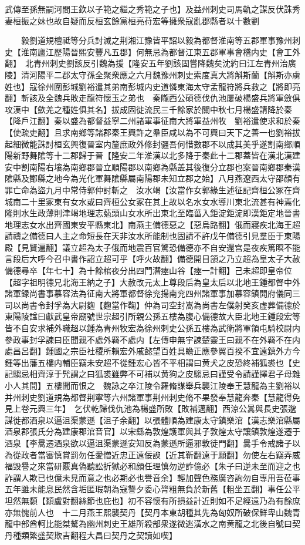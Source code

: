 武傳至孫無嗣河間王欽以子範之繼之秀範之子也】及益州刺史司馬軌之謀反伏誅秀妻桓振之妹也故自疑而反桓玄餘黨桓亮苻宏等擁衆寇亂郡縣者以十數劉

　　毅劉道規檀祗等分兵討滅之荆湘江豫皆平詔以毅為都督淮南等五郡軍事豫州刺史【淮南廬江歷陽晉熙安豐凡五郡】何無忌為都督江東五郡軍事會稽内史【會工外翻】　北青州刺史劉該反引魏為援【隆安五年劉該固嘗降魏矣沈約曰江左青州治廣陵】清河陽平二郡太守孫全聚衆應之六月魏豫州刺史索度真大將斛斯蘭【斛斯亦虜姓也】寇徐州圍彭城劉裕遣其弟南彭城内史道憐東海太守孟龍符將兵救之【將即亮翻】斬該及全魏兵敗走龍符懷玉之弟也　秦隴西公碩德伐仇池屢破楊盛兵將軍斂俱攻漢中【歛羌之種姓俱其名】拔成固徙流民三千餘家於關中秋七月楊盛請降於秦【降戶江翻】秦以盛為都督益寧二州諸軍事征南大將軍益州牧　劉裕遣使求和於秦【使疏吏翻】且求南鄉等諸郡秦王興許之羣臣咸以為不可興曰天下之善一也劉裕拔起細微能誅討桓玄興復晉室内釐庶政外修封疆吾何惜數郡不以成其美乎遂割南鄉順陽新野舞隂等十二郡歸于晉【隆安二年淮漢以北多降于秦此十二郡蓋皆在漢北漢建安中割南陽右壤為南鄉郡晉立順陽郡以南鄉為縣盖其後復分立郡也案晉南鄉郡秦漢隂縣及鄼縣之地今為光化軍舞隂縣屬南陽郡未知立郡之始】八月燕遼西太守邵顔有罪亡命為盜九月中常侍郭仲討斬之　汝水竭【汝當作女郭緣生述征記齊桓公冢在齊城南二十里冢東有女水或曰齊桓公女冢在其上故以名水女水導川東北流甚有神焉化隆則水生政薄則津竭地理志葂頭山女水所出東北至臨菑入鉅淀鉅淀即漢鉅定地晉書地理志女水出齊國東安平縣東北】南燕主備德惡之【惡烏路翻】俄而寢疾北海王超請禱之備德曰人主之命短長在天非汝水所能制也固請不許戊午備德引見羣臣于東陽殿【見賢遍翻】議立超為太子俄而地震百官驚恐備德亦不自安還宫是夜疾篤瞑不能言段后大呼今召中書作詔立超可乎【呼火故翻】備德開目頷之乃立超為皇太子大赦備德尋卒【年七十】為十餘棺夜分出四門潛瘞山谷【瘞一計翻】己未超即皇帝位【超字祖明德兄北海王納之子】大赦改元太上尊段后為皇太后以北地王鍾都督中外諸軍録尚書事慕容法為征南大將軍都督徐兖揚南兖四州諸軍事加慕容鎮開府儀同三司以尚書令封孚為大尉麴【麴當作鞠】仲為司空封嵩為尚書左僕射癸亥虚葬備德於東陽陵諡曰獻武皇帝廟號世宗超引所親公孫五樓為腹心備德故大臣北地王鍾段宏等皆不自安求補外職超以鍾為青州牧宏為徐州刺史公孫五樓為武衛將軍領屯騎校尉内參政事封孚諫曰臣聞親不處外羇不處内【左傳申無宇諫楚靈王曰親不在外羇不在内處昌呂翻】鍾國之宗臣社稷所賴宏外戚懿望百姓具瞻正應參翼百揆不宜遠鎮外方今鍾等出藩五樓内輔臣竊未安超不從鍾宏心皆不平相謂曰黄犬之皮恐終補狐裘也【史記騶忌相齊淳于髠謂之曰狐裘雖弊不可補以黄狗之皮騶忌曰謹受令請謹擇君子母雜小人其間】五樓聞而恨之　魏詠之卒江陵令羅脩謀舉兵襲江陵奉王慧龍為主劉裕以并州刺史劉道規為都督荆寧等六州諸軍事荆州刺史脩不果發奉慧龍奔秦【慧龍得免見上卷元興三年】　乞伏乾歸伐仇池為楊盛所敗【敗補邁翻】西涼公暠與長史張邈謀徙都酒泉以逼沮渠蒙遜【沮子余翻】以張體順為建康太守鎮樂涫【漢志樂涫縣屬酒泉郡張氏分為建康郡涫音官】以宋繇為敦煌護軍與其子敦煌太守讓鎮敦煌遂遷于酒泉【李暠遷酒泉欲以逼沮渠蒙遜安知反為蒙遜所逼邪敦徒門翻】暠手令戒諸子以為從政者當審慎賞罰勿任愛憎近忠正遠佞諛【近其靳翻遠于願翻】勿使左右竊弄威福毁譽之來當研覈真偽聽訟折獄必和顔任理慎勿逆詐億必【朱子曰逆未至而迎之也詐謂人欺已也億未見而意之也必期必也譽音余】輕加聲色務廣咨詢勿自專用吾莅事五年雖未能息民然含垢匿瑕朝為寇讐夕委心膂粗無負於新舊【粗坐五翻】事任公平坦然無纇【纇盧對翻絲節也庇也】初不容懷有所損益計近則如不足經遠乃為有餘庶亦無愧前人也　十二月燕王熙襲契丹【契丹本東胡種其先為匈奴所破保鮮卑山魏青龍中部酋軻比能桀驁為幽州刺史王雄所殺部衆遂微逃潢水之南黄龍之北後自號曰契丹種類繁盛契欺吉翻程大昌曰契丹之契讀如喫】

